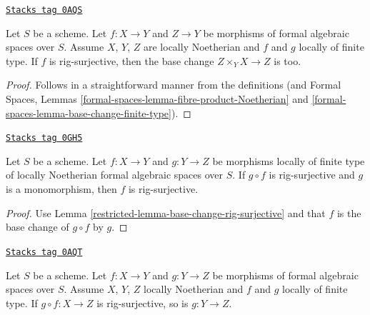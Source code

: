 \begin{lemma}
\label{restricted-lemma-base-change-rig-surjective}
\href{https://stacks.math.columbia.edu/tag/0AQS}{\texttt{Stacks tag 0AQS}}

Let $S$ be a scheme. Let $f : X \to Y$ and $Z \to Y$ be morphisms
of formal algebraic spaces over $S$. Assume $X$, $Y$, $Z$ are locally
Noetherian and $f$ and $g$ locally of finite type. If $f$ is
rig-surjective, then the base change $Z \times_Y X \to Z$ is too.
\end{lemma}

\begin{proof}
Follows in a straightforward manner from the definitions (and
Formal Spaces, Lemmas \ref{formal-spaces-lemma-fibre-product-Noetherian} and
\ref{formal-spaces-lemma-base-change-finite-type}).
\end{proof}

\begin{lemma}
\label{restricted-lemma-rig-surjective-alternative-permanence}
\href{https://stacks.math.columbia.edu/tag/0GH5}{\texttt{Stacks tag 0GH5}}

Let $S$ be a scheme. Let $f : X \to Y$ and $g : Y \to Z$
be morphisms locally of finite type of locally Noetherian
formal algebraic spaces over $S$. If $g \circ f$ is rig-surjective
and $g$ is a monomorphism, then $f$ is rig-surjective.
\end{lemma}

\begin{proof}

Use Lemma \ref{restricted-lemma-base-change-rig-surjective} and that
$f$ is the base change of $g \circ f$ by $g$.
\end{proof}

\begin{lemma}
\label{restricted-lemma-permanence-rig-surjective}
\href{https://stacks.math.columbia.edu/tag/0AQT}{\texttt{Stacks tag 0AQT}}

Let $S$ be a scheme. Let $f : X \to Y$ and $g : Y \to Z$ be morphisms of
formal algebraic spaces over $S$. Assume $X$, $Y$, $Z$ locally Noetherian
and $f$ and $g$ locally of finite type. If $g \circ f : X \to Z$
is rig-surjective, so is $g : Y \to Z$.
\end{lemma}

